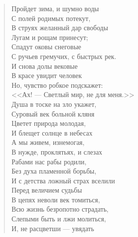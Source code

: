 \newpage
\vspace*{0cm}


\begin{verse}
\begin{altverse}
Пройдет зима, и шумно воды\\
    С полей родимых потекут,\\
В струях желанный дар свободы\\
    Лугам и рощам принесут;\\
Спадут оковы снеговые\\
    С ручьев гремучих, с быстрых рек.\\
И снова долы вековые\\
    В красе увидит человек\ldotst\\
Но, чувство робкое подскажет:\\
    <<Ах! --- Светлый мир, не для меня.>>\\
Душа в тоске на зло укажет,\\
    Суровый век больной кляня\ldotst\\
Цветет природа молодая,\\
    И блещет солнце в небесах\ldotst\\
А мы живем, изнемогая,\\
    В нужде, проклятьях, и слезах\ldotst\\
Рабами нас рабы родили,\\
    Без духа пламенной борьбы,\\
И с детства ложный страх вселили\\
    Перед величием судьбы\ldotst\\
В цепях неволи век томиться,\\
    Всю жизнь безропотно страдать,\\
Слепыми быть и лжи молиться,\\
И, не расцветши --- увядать\ldotst
\end{altverse}
\end{verse}

\newpage
\vspace*{0cm}


